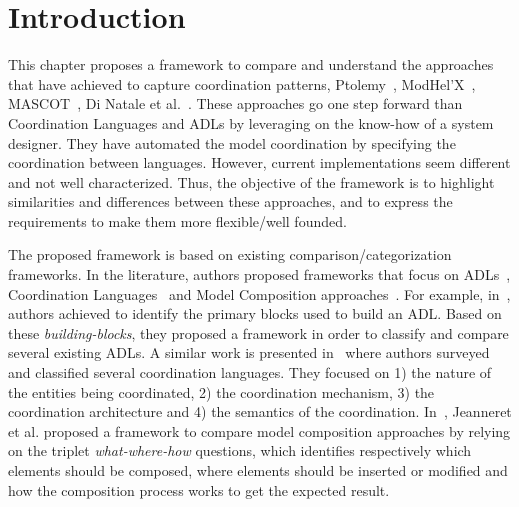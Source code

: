 \section{Introduction}
This chapter proposes a framework to compare and understand the approaches that have achieved to capture coordination patterns, \ie Ptolemy~\cite{ptoleframebib}, ModHel'X~\cite{modhelxbib}, MASCOT~\cite{mascotbib}, Di Natale et al.~\cite{dinatale}. These approaches go one step forward than Coordination Languages and ADLs by leveraging on the know-how of a system designer. They have automated the model coordination by specifying the coordination between languages. However, current implementations seem different and not well characterized. Thus, the objective of the framework is to highlight similarities and differences between these approaches, and to express the requirements to make them more flexible/well founded.

The proposed framework is based on existing comparison/categorization frameworks. In the literature, authors proposed frameworks that focus on ADLs~\cite{frameadlsbib}, Coordination Languages~\cite{coordmodels} and Model Composition approaches~\cite{framecompoas}. For example, in~\cite{frameadlsbib}, authors achieved to identify the primary blocks used to build an ADL. Based on these \emph{building-blocks}, they proposed a framework in order to classify and compare several existing ADLs. A similar work is presented in~\cite{coordmodels} where authors surveyed and classified several coordination languages. They focused on 1) the nature of the entities being coordinated, 2) the coordination mechanism, 3) the coordination architecture and 4) the semantics of the coordination. In~\cite{framecompoas}, Jeanneret et al. proposed a framework to compare model composition approaches by relying on the triplet \emph{what-where-how} questions, which identifies respectively which elements should be composed, where elements should be inserted or modified and how the composition process works to get the expected result. 

